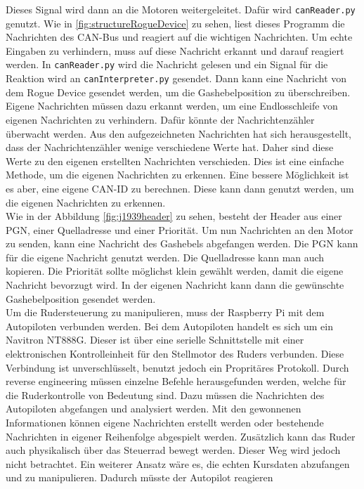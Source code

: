 Dieses Signal wird dann an die Motoren weitergeleitet. Dafür wird \texttt{canReader.py} genutzt. 
Wie in \ref{fig:structureRogueDevice} zu sehen, liest dieses Programm die
Nachrichten des CAN-Bus und reagiert auf die wichtigen Nachrichten.
Um echte Eingaben zu verhindern, muss auf diese Nachricht erkannt und darauf reagiert werden. 
In \texttt{canReader.py} wird die Nachricht gelesen und ein Signal für die Reaktion wird an \texttt{canInterpreter.py} 
gesendet. 
Dann kann eine Nachricht von dem Rogue Device gesendet werden, um die Gashebelposition
zu überschreiben. Eigene Nachrichten müssen dazu erkannt werden, um eine Endlosschleife von eigenen Nachrichten zu verhindern. Dafür könnte
der Nachrichtenzähler überwacht werden. Aus den aufgezeichneten Nachrichten hat sich herausgestellt, dass der 
Nachrichtenzähler wenige verschiedene Werte hat. Daher sind diese Werte zu den eigenen erstellten Nachrichten 
verschieden. Dies ist eine einfache Methode, um die eigenen Nachrichten zu erkennen. Eine bessere Möglichkeit ist es aber,
eine eigene CAN-ID zu berechnen. Diese kann dann genutzt werden, um die eigenen Nachrichten zu erkennen. \\
Wie in der Abbildung \ref{fig:j1939header} zu sehen, besteht der Header aus einer PGN, einer Quelladresse und einer Priorität. Um nun Nachrichten
an den Motor zu senden, kann eine Nachricht des Gashebels abgefangen werden. Die PGN kann für die eigene Nachricht genutzt
werden. Die Quelladresse kann man auch kopieren. Die Priorität sollte möglichst klein gewählt werden, 
damit die eigene Nachricht bevorzugt wird. In der eigenen Nachricht kann dann die gewünschte Gashebelposition gesendet werden.
\\
Um die Rudersteuerung zu manipulieren, muss der Raspberry Pi mit dem Autopiloten verbunden werden. Bei dem Autopiloten
handelt es sich um ein Navitron NT888G. Dieser ist über eine serielle Schnittstelle mit einer elektronischen Kontrolleinheit
für den Stellmotor des Ruders verbunden. Diese Verbindung ist unverschlüsselt, benutzt jedoch ein Propritäres Protokoll.
Durch reverse engineering müssen einzelne Befehle herausgefunden werden, welche für die Ruderkontrolle von Bedeutung sind.
Dazu müssen die Nachrichten des Autopiloten abgefangen und analysiert werden. Mit den gewonnenen Informationen können
eigene Nachrichten erstellt werden oder bestehende Nachrichten in eigener Reihenfolge abgespielt werden.
Zusätzlich kann das Ruder auch physikalisch über das Steuerrad bewegt werden. Dieser Weg wird jedoch nicht betrachtet.
Ein weiterer Ansatz wäre es, die echten Kursdaten abzufangen und zu manipulieren. Dadurch müsste der Autopilot reagieren
